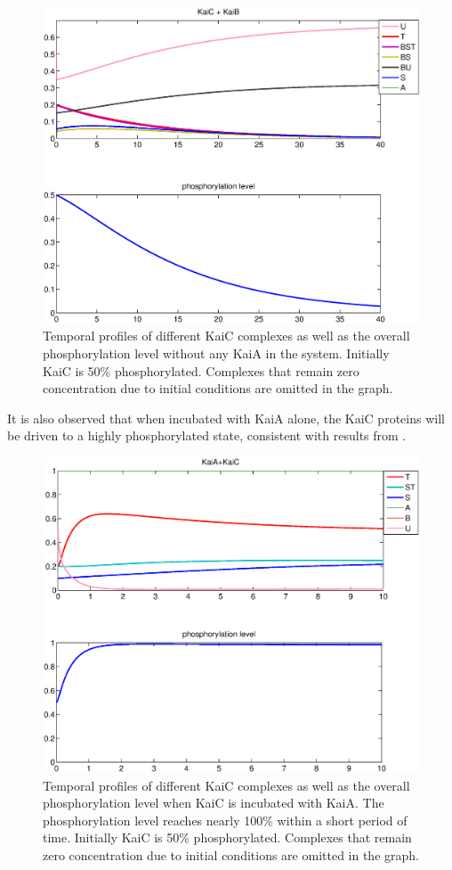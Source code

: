 \documentclass[a4paper,10pt]{article}
\numberwithin{equation}{section}
\begin{document}
\begin{figure}
\centering
\includegraphics[scale=0.6]{B+C.eps}
\caption{\selectfont Temporal profiles of different KaiC complexes as well as the overall phosphorylation level without any KaiA in the system. Initially KaiC is 50\% phosphorylated. Complexes that remain zero concentration due to initial conditions are omitted in the graph.}
\label{fig:B+C}
\end{figure}
It is also observed that when incubated with KaiA alone, the KaiC proteins will be driven to a highly phosphorylated state, consistent with results from \citet{Tamito2005}.
\begin{figure}[H]
\centering
\includegraphics[scale=0.6]{A+C.eps}
\caption{\selectfont Temporal profiles of different KaiC complexes as well as the overall phosphorylation level when KaiC is incubated with KaiA. The phosphorylation level reaches nearly 100\% within a short period of time. Initially KaiC is 50\% phosphorylated. Complexes that remain zero concentration due to initial conditions are omitted in the graph.}
\label{fig:A+C}
\end{figure}
\end{document}
